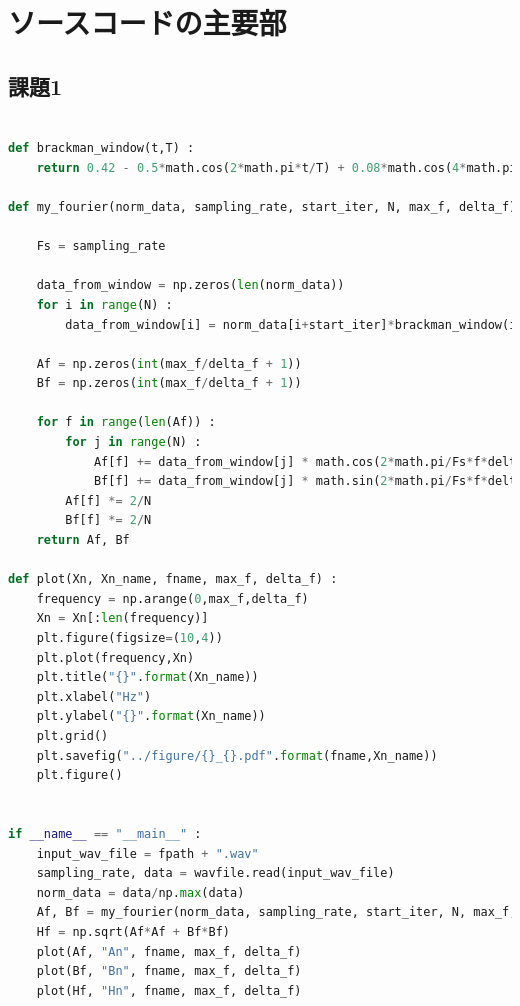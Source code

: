\documentclass[a4j,11pt]{jarticle}
\begin{document}
    \section{ソースコードの主要部}
    \subsection{課題1}
    \begin{lstlisting}[language = Python , caption = fourier.py]

def brackman_window(t,T) :
    return 0.42 - 0.5*math.cos(2*math.pi*t/T) + 0.08*math.cos(4*math.pi*t/T)

def my_fourier(norm_data, sampling_rate, start_iter, N, max_f, delta_f) :

    Fs = sampling_rate

    data_from_window = np.zeros(len(norm_data))
    for i in range(N) :
        data_from_window[i] = norm_data[i+start_iter]*brackman_window(i,N)
    
    Af = np.zeros(int(max_f/delta_f + 1))
    Bf = np.zeros(int(max_f/delta_f + 1))

    for f in range(len(Af)) :
        for j in range(N) :
            Af[f] += data_from_window[j] * math.cos(2*math.pi/Fs*f*delta_f*j)
            Bf[f] += data_from_window[j] * math.sin(2*math.pi/Fs*f*delta_f*j)
        Af[f] *= 2/N
        Bf[f] *= 2/N
    return Af, Bf

def plot(Xn, Xn_name, fname, max_f, delta_f) :
    frequency = np.arange(0,max_f,delta_f)
    Xn = Xn[:len(frequency)]
    plt.figure(figsize=(10,4))
    plt.plot(frequency,Xn)
    plt.title("{}".format(Xn_name))
    plt.xlabel("Hz")
    plt.ylabel("{}".format(Xn_name))
    plt.grid()
    plt.savefig("../figure/{}_{}.pdf".format(fname,Xn_name))
    plt.figure()


if __name__ == "__main__" :
    input_wav_file = fpath + ".wav"
    sampling_rate, data = wavfile.read(input_wav_file)
    norm_data = data/np.max(data)
    Af, Bf = my_fourier(norm_data, sampling_rate, start_iter, N, max_f, delta_f)
    Hf = np.sqrt(Af*Af + Bf*Bf)
    plot(Af, "An", fname, max_f, delta_f)
    plot(Bf, "Bn", fname, max_f, delta_f)
    plot(Hf, "Hn", fname, max_f, delta_f)
    \end{lstlisting}
\end{document}
